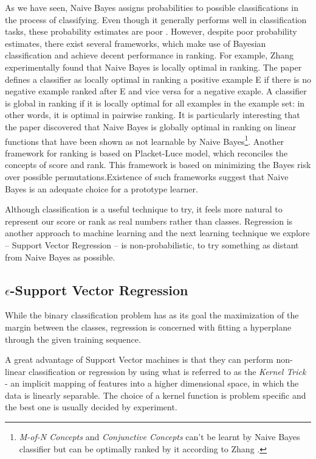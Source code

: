\documentclass[12pt,notitlepage,twoside]{scrreprt}
\begin{document}
As we have seen, Naive Bayes assigns probabilities to possible classifications
in the process of classifying. Even though it generally performs well in
classification tasks, these probability estimates are poor \cite{domingos96}.
However, despite poor probability estimates, there exist several frameworks,
which make use of Bayesian classification and achieve decent performance in
ranking. For example, Zhang \cite{zhang04} experimentally found that Naive
Bayes is locally optimal in ranking. The paper defines a classifier as locally
optimal in ranking a positive example E if there is no negative example ranked
after E and vice versa for a negative exaple. A classifier is global in ranking
if it is locally optimal for all examples in the example set: in other words,
it is optimal in pairwise ranking.  It is particularly interesting that the
paper discovered that Naive Bayes is globally optimal in ranking on linear
functions that have been shown as not learnable by Naive
Bayes\footnote{\textit{M-of-N
  Concepts} and \textit{Conjunctive Concepts} can't be learnt by Naive Bayes classifier but
can be optimally ranked by it according to Zhang \cite{zhang04}.}.
Another framework for ranking \cite{bayesrank} is based on Placket-Luce model, which reconciles
the concepts of score and rank. This framework is based on minimizing the Bayes
risk over possible permutations.Existence of such frameworks suggest that Naive Bayes is an adequate choice
for a prototype learner.

Although classification is a useful technique to try, it feels more natural to
represent our score or rank as real numbers rather than classes. Regression is
another approach to machine learning and the next learning technique we explore
-- Support Vector Regression -- is non-probabilistic, to try something as distant
from Naive Bayes as possible.

\subsection{$\epsilon$-Support Vector Regression}
While the binary classification problem has as its goal the maximization of the
margin between the classes, regression is concerned with fitting a hyperplane
through the given training sequence. 

A great advantage of Support Vector machines is that they can perform
non-linear classification or regression by using what is referred to as the
\textit{Kernel Trick} - an implicit mapping of features into a higher
dimensional space, in which the data is linearly separable. The choice of a
kernel function is problem specific and the best one is usually decided by
experiment.
\end{document}
